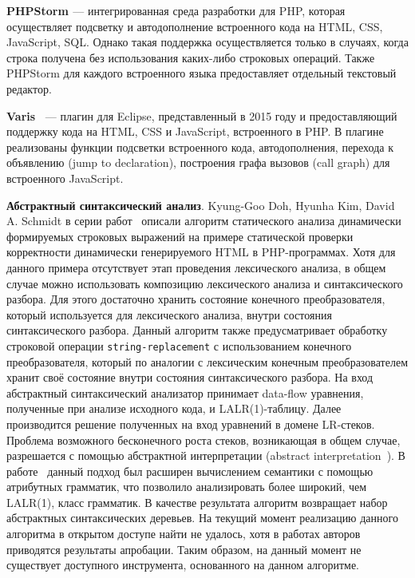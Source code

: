 \textbf{PHPStorm \cite{PHPStorm}} --- интегрированная среда разработки для PHP, которая осуществляет подсветку и автодополнение встроенного кода на HTML, CSS, JavaScript, SQL. Однако такая поддержка осуществляется только в случаях, когда строка получена без использования каких-либо строковых операций. Также PHPStorm для каждого встроенного языка предоставляет отдельный текстовый редактор. 

\textbf{Varis~\cite{Varis}} ---  плагин для Eclipse, представленный в 2015 году и предоставляющий поддержку кода на HTML, CSS и JavaScript, встроенного в PHP. В плагине реализованы функции  подсветки встроенного кода, автодополнения, перехода к объявлению (jump to declaration), построения графа вызовов (call graph) для встроенного JavaScript.

\textbf{Абстрактный синтаксический анализ}. Kyung-Goo Doh,  Hyunha Kim, David A. Schmidt в серии работ~\cite{LrAbstract1, LrAbstract2, LRAbstractParsingSema} описали алгоритм статического анализа динамически формируемых строковых выражений на примере статической проверки корректности динамически генерируемого HTML в PHP-программах. Хотя для данного примера отсутствует этап проведения лексического анализа, в общем случае можно использовать композицию лексического анализа и синтаксического разбора. Для этого достаточно хранить состояние конечного преобразователя, который используется для лексического анализа, внутри состояния синтаксического разбора. Данный алгоритм также предусматривает обработку строковой операции \verb|string-replacement| с использованием конечного преобразователя, который по аналогии с лексическим конечным преобразователем хранит своё состояние внутри состояния синтаксического разбора. На вход абстрактный синтаксический анализатор принимает data-flow  уравнения, полученные при анализе исходного кода, и  LALR(1)-таблицу. Далее производится решение полученных на вход уравнений в домене LR-стеков.  Проблема возможного бесконечного роста стеков, возникающая в общем случае, разрешается с помощью абстрактной интерпретации (abstract interpretation~\cite{AbstractInterpretation}). В работе~\cite{LRAbstractParsingSema} данный подход был расширен вычислением семантики с помощью атрибутных грамматик, что позволило анализировать более широкий, чем LALR(1), класс грамматик. В качестве результата алгоритм возвращает набор абстрактных синтаксических деревьев. На текущий момент реализацию данного алгоритма в открытом доступе найти не удалось, хотя в работах авторов приводятся результаты апробации. Таким образом, на данный момент не существует доступного инструмента, основанного на данном алгоритме.

